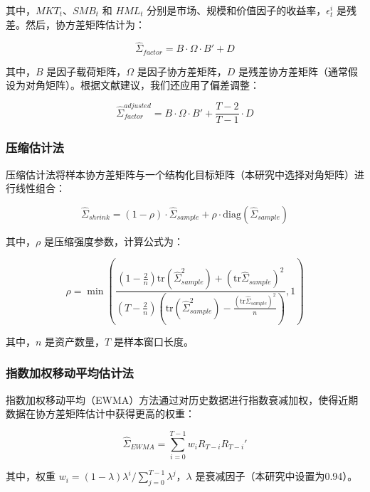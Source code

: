 \documentclass[12pt, a4paper]{article}
\begin{document}
其中，$MKT_t$、$SMB_t$ 和 $HML_t$ 分别是市场、规模和价值因子的收益率，$\epsilon_t^i$ 是残差。然后，协方差矩阵估计为：

\begin{equation}
\hat{\Sigma}_{factor} = B \cdot \Omega \cdot B' + D
\end{equation}

其中，$B$ 是因子载荷矩阵，$\Omega$ 是因子协方差矩阵，$D$ 是残差协方差矩阵（通常假设为对角矩阵）。根据文献建议，我们还应用了偏差调整：

\begin{equation}
\hat{\Sigma}_{factor}^{adjusted} = B \cdot \Omega \cdot B' + \frac{T-2}{T-1} \cdot D
\end{equation}

\subsubsection{压缩估计法}
压缩估计法将样本协方差矩阵与一个结构化目标矩阵（本研究中选择对角矩阵）进行线性组合：

\begin{equation}
\hat{\Sigma}_{shrink} = (1-\rho) \cdot \hat{\Sigma}_{sample} + \rho \cdot \text{diag}(\hat{\Sigma}_{sample})
\end{equation}

其中，$\rho$ 是压缩强度参数，计算公式为：

\begin{equation}
\rho = \min \left( \frac{(1 - \frac{2}{n}) \text{tr}(\hat{\Sigma}_{sample}^2) + (\text{tr}\hat{\Sigma}_{sample})^2}{(T - \frac{2}{n}) \left( \text{tr}(\hat{\Sigma}_{sample}^2) - \frac{(\text{tr}\hat{\Sigma}_{sample})^2}{n} \right)}, 1 \right)
\end{equation}

其中，$n$ 是资产数量，$T$ 是样本窗口长度。

\subsubsection{指数加权移动平均估计法}
指数加权移动平均（EWMA）方法通过对历史数据进行指数衰减加权，使得近期数据在协方差矩阵估计中获得更高的权重：

\begin{equation}
\hat{\Sigma}_{EWMA} = \sum_{i=0}^{T-1} w_i R_{T-i} R_{T-i}'
\end{equation}

其中，权重 $w_i = (1-\lambda)\lambda^i / \sum_{j=0}^{T-1} \lambda^j$，$\lambda$ 是衰减因子（本研究中设置为0.94）。
\end{document}
